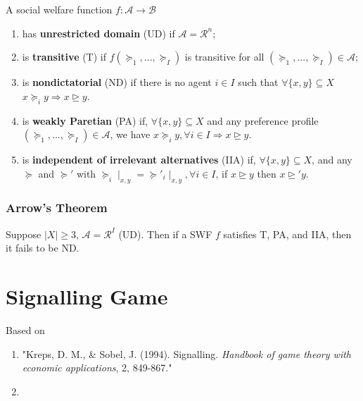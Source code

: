 \documentclass[11pt]{elegantbook}
\begin{document}
\begin{definition}
    \normalfont
    A social welfare function $f: \mathcal{A}\rightarrow \mathcal{B}$
    \begin{enumerate}[$\circ$]
        \item has \textbf{unrestricted domain} (UD) if $\mathcal{A}=\mathcal{R}^n$;
        \item is \textbf{transitive} (T) if $f(\succeq_1,...,\succeq_I)$ is transitive for all $(\succeq_1,...,\succeq_I)\in \mathcal{A}$;
        \item is \textbf{nondictatorial} (ND) if there is no agent $i\in I$ such that $\forall \{x,y\}\subseteq X$ $x\succeq_i y \Rightarrow x\trianglerighteq y$.
        \item is \textbf{weakly Paretian} (PA) if, $\forall \{x,y\}\subseteq X$ and any preference profile $(\succeq_1,...,\succeq_I)\in \mathcal{A}$, we have $x\succeq_i y,\forall i\in I \Rightarrow x\trianglerighteq y$.
        \item is \textbf{independent of irrelevant alternatives} (IIA) if, $\forall \{x,y\}\subseteq X$, and any $\succeq$ and $\succeq'$ with $\succeq_i\mid_{x,y}=\succeq'_i\mid_{x,y}, \forall i\in I$, if $x\trianglerighteq y$ then $x\trianglerighteq' y$.
    \end{enumerate}
\end{definition}


\subsection{Arrow's Theorem}
\begin{theorem}
    Suppose $|X|\geq 3$, $\mathcal{A}=\mathcal{R}^I$ (UD). Then if a SWF $f$ satisfies T, PA, and IIA, then it fails to be ND.
\end{theorem}















\chapter{Signalling Game}
Based on
\begin{enumerate}[$\circ$]
    \item "Kreps, D. M., \& Sobel, J. (1994). Signalling. \textit{Handbook of game theory with economic applications}, 2, 849-867."
    \item 
\end{enumerate}
\end{document}
